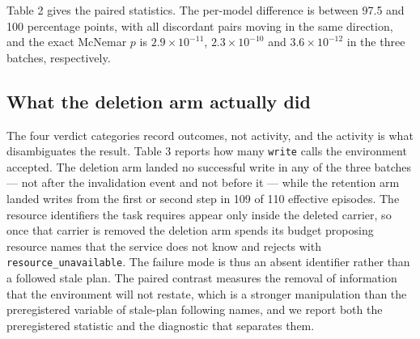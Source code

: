 \documentclass[11pt]{article}
\begin{document}
\begin{sloppypar}
\begin{table}[t]
\centering
\caption{Per-batch cell counts over 40 cards per arm. Effective units are RECOVERED plus STALE\_FAILURE; transport losses are excluded from all cells; truncated and pre-injection completions are shown separately and do not enter the paired denominator.}
\label{tab:1}

\end{table}

Table 2 gives the paired statistics. The per-model difference is between 97.5 and 100 percentage points, with all discordant pairs moving in the same direction, and the exact McNemar $p$ is $2.9\times10^{-11}$, $2.3\times10^{-10}$ and $3.6\times10^{-12}$ in the three batches, respectively.

\begin{table}[t]
\centering
\caption{Paired contrasts, with the deletion-minus-retention token ratio and its paired bootstrap interval. The last column is the preregistered cost gate from the first iteration, shown for continuity only; the second-iteration protocol does not presuppose a cost direction.}
\label{tab:2}

\end{table}

\subsection{What the deletion arm actually did}

The four verdict categories record outcomes, not activity, and the activity is what disambiguates the result. Table 3 reports how many \texttt{write} calls the environment accepted. The deletion arm landed no successful write in any of the three batches --- not after the invalidation event and not before it --- while the retention arm landed writes from the first or second step in 109 of 110 effective episodes. The resource identifiers the task requires appear only inside the deleted carrier, so once that carrier is removed the deletion arm spends its budget proposing resource names that the service does not know and rejects with \texttt{resource\_unavailable}. The failure mode is thus an absent identifier rather than a followed stale plan. The paired contrast measures the removal of information that the environment will not restate, which is a stronger manipulation than the preregistered variable of stale-plan following names, and we report both the preregistered statistic and the diagnostic that separates them.

\begin{table}[t]
\centering
\caption{Write-level diagnostic per batch and arm. \emph{pre} and \emph{post} are accepted over attempted \texttt{write} calls before and after the invalidation event; \emph{zero-write} counts episodes with no accepted write, out of the arm size.}
\label{tab:3}

\end{table}


\end{sloppypar}
\end{document}
